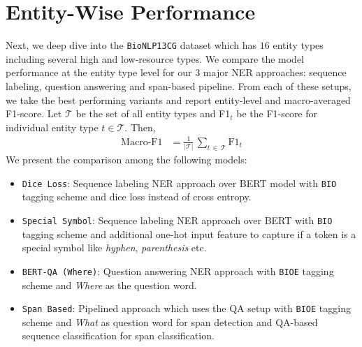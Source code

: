 \section{Entity-Wise Performance}
Next, we deep dive into the \texttt{BioNLP13CG} dataset which has $16$ entity types including several high and low-resource types. We compare the model performance at the entity type level for our 3 major NER approaches: sequence labeling, question answering and span-based pipeline. From each of these setups, we take the best performing variants and report entity-level and macro-averaged F1-score. Let $\mathcal{T}$ be the set of all entity types and F1$_t$ be the F1-score for individual entity type $t \in \mathcal{T}$. Then,
\begin{align*}
    \text{Macro-F1} &= \frac{1}{\mathcal{\vert\mathcal{T}\vert}}\,\sum_{t\,\in\,\mathcal{T}}{\text{F1}_t}
\end{align*}
We present the comparison among the following models:
\begin{itemize}
    \item \texttt{Dice Loss}: Sequence labeling NER approach over BERT model with \texttt{BIO} tagging scheme and dice loss instead of cross entropy.
    
    \item \texttt{Special Symbol}: Sequence labeling NER approach over BERT with \texttt{BIO} tagging scheme and additional one-hot input feature to capture if a token is a special symbol like \textit{hyphen}, \textit{parenthesis} etc.
    
    \item \texttt{BERT-QA (Where)}: Question answering NER approach with \texttt{BIOE} tagging scheme and \textit{Where} as the question word.
    
    \item \texttt{Span Based}: Pipelined approach which uses the QA setup with \texttt{BIOE} tagging scheme and \textit{What} as question word for span detection and QA-based sequence classification for span classification.
\end{itemize}

